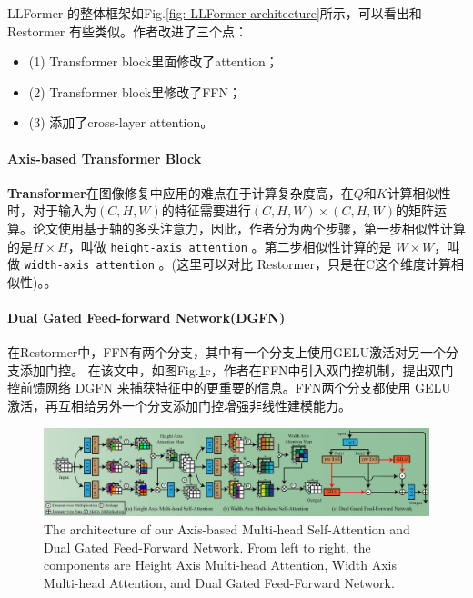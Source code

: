 \documentclass[letterpaper,10pt]{article}
\begin{document}
	LLFormer 的整体框架如Fig.\ref{fig: LLFormer architecture}所示，可以看出和 Restormer 有些类似。作者改进了三个点：
	\begin{itemize}
		\item {(1)} Transformer block里面修改了attention；
		\item {(2)} Transformer block里修改了FFN；
		\item {(3)} 添加了cross-layer attention。
	\end{itemize}
	
	\paragraph{Axis-based Transformer Block}
	
	\textbf{Transformer}在图像修复中应用的难点在于计算复杂度高，在$Q$和$K$计算相似性时，对于输入为$(C,H,W)$的特征需要进行$(C,H,W) \times (C,H,W)$的矩阵运算。论文使用基于轴的多头注意力，因此，作者分为两个步骤，第一步相似性计算的是$H \times H$，叫做 \texttt{height-axis attention} 。第二步相似性计算的是 $W \times W$，叫做 \texttt{width-axis attention} 。(这里可以对比 Restormer，只是在C这个维度计算相似性)。。
	
	\paragraph{Dual Gated Feed-forward Network(DGFN)}
	
	在Restormer中，FFN有两个分支，其中有一个分支上使用GELU激活对另一个分支添加门控。
	在该文中，如图Fig.\ref{fig: Axis-based Transformer Block & Dual Gated Feed-forward Network(GDFN)}c，作者在FFN中引入双门控机制，提出双门控前馈网络 DGFN 来捕获特征中的更重要的信息。FFN两个分支都使用 GELU 激活，再互相给另外一个分支添加门控增强非线性建模能力。
	
	\begin{figure}[htbp]
		\centering 
		\includegraphics[width=\columnwidth]{picture/Axis_based_Transformer_Block_&_Dual_Gated_Feed-forward_Network(GDFN)}
		\captionsetup{font=scriptsize}
		\caption{
			\label{fig: Axis-based Transformer Block & Dual Gated Feed-forward Network(GDFN)} %
			The architecture of our Axis-based Multi-head Self-Attention and Dual Gated Feed-Forward Network. From left to right, the components are Height Axis Multi-head Attention, Width Axis Multi-head Attention, and Dual Gated Feed-Forward Network.
		}
	\end{figure}
	
\end{document}
